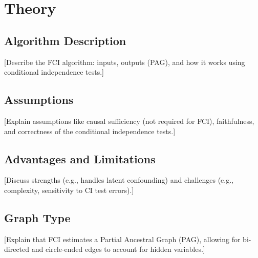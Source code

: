 \documentclass[main.tex]{subfiles}
\begin{document}
\section{Theory}

\subsection{Algorithm Description}
[Describe the FCI algorithm: inputs, outputs (PAG), and how it works using conditional independence tests.]

\subsection{Assumptions}
[Explain assumptions like causal sufficiency (not required for FCI), faithfulness, and correctness of the conditional independence tests.]

\subsection{Advantages and Limitations}
[Discuss strengths (e.g., handles latent confounding) and challenges (e.g., complexity, sensitivity to CI test errors).]

\subsection{Graph Type}
[Explain that FCI estimates a Partial Ancestral Graph (PAG), allowing for bi-directed and circle-ended edges to account for hidden variables.]
\end{document}
